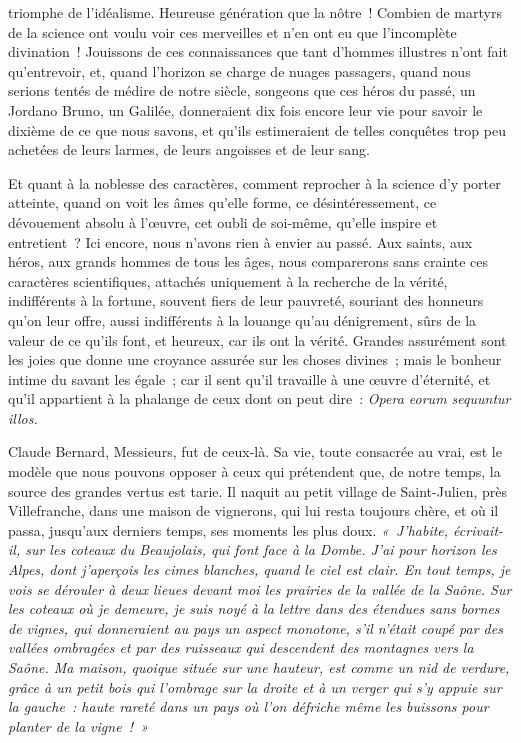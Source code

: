 \documentclass[french,twoside]{book} %
\newcommand\persName[1]{#1}
\newcommand\placeName[1]{#1}
\begin{document}
triomphe de l’idéalisme. Heureuse génération que la nôtre ! Combien de martyrs de la science ont voulu voir ces merveilles et n’en ont eu que l’incomplète divination ! Jouissons de ces connaissances que tant d’hommes illustres n’ont fait qu’entrevoir, et, quand l’horizon se charge de nuages passagers, quand nous serions tentés de médire de notre siècle, songeons que ces héros du passé, un {\persName Jordano Bruno}, un {\persName Galilée}, donneraient dix fois encore leur vie pour savoir le dixième de ce que nous savons, et qu’ils estimeraient de telles conquêtes trop peu achetées de leurs larmes, de leurs angoisses et de leur sang.\par
Et quant à la noblesse des caractères, comment reprocher à la science d’y porter atteinte, quand on voit les âmes qu’elle forme, ce désintéressement, ce dévouement absolu à l’œuvre, cet oubli de soi-même, qu’elle inspire et entretient ? Ici encore, nous n’avons rien à envier au passé. Aux saints, aux héros, aux grands hommes de tous les âges, nous comparerons sans crainte ces caractères scientifiques, attachés uniquement à la recherche de la vérité, indifférents à la fortune, souvent fiers de leur pauvreté, souriant des honneurs qu’on leur offre, aussi indifférents à la louange qu’au dénigrement, sûrs de la valeur de ce qu’ils font, et heureux, car ils ont la vérité. Grandes assurément sont les joies que donne une croyance assurée sur les choses divines ; mais le bonheur intime du savant les égale ; car il sent qu’il travaille à une œuvre d’éternité, et qu’il appartient à la phalange de ceux dont on peut dire : \emph{Opera eorum sequuntur illos.}\par
{\persName Claude Bernard}, Messieurs, fut de ceux-là. Sa vie, toute consacrée au vrai, est le modèle que nous pouvons opposer à ceux qui prétendent que, de notre temps, la source des grandes vertus est tarie. Il naquit au petit {\placeName village de Saint-Julien}, près {\placeName Villefranche}, dans une maison de vignerons, qui lui resta toujours chère, et où il passa, jusqu’aux derniers temps, ses moments les plus doux. \emph{« J’habite, écrivait-il, sur les {\placeName coteaux du Beaujolais}, qui font face à la {\placeName Dombe}. J’ai pour horizon les {\placeName Alpes}, dont j’aperçois les cimes blanches, quand le ciel est clair. En tout temps, je vois se dérouler à deux lieues devant moi les prairies de la {\placeName vallée de la Saône}. Sur les coteaux où je demeure, je suis noyé à la lettre dans des étendues sans bornes de vignes, qui donneraient au pays un aspect monotone, s’il n’était coupé par des vallées ombragées et par des ruisseaux qui descendent des montagnes vers la Saône. Ma maison, quoique située sur une hauteur, est comme un nid de verdure, grâce à un petit bois qui l’ombrage sur la droite et à un verger qui s’y appuie sur la gauche : haute rareté dans un pays où l’on défriche même les buissons pour planter de la vigne ! »}\par
\end{document}
